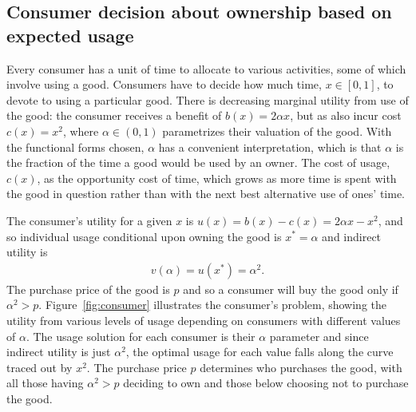 \documentclass[11pt]{article}
\begin{document}
\subsection{Consumer decision about ownership based on expected usage}  
Every consumer has a unit of time to allocate to various activities, some of which involve using a good.  
Consumers have to decide how much time, $x \in [0,1]$, to devote to using a particular good. 
There is decreasing marginal utility from use of the good: 
the consumer receives a benefit of $b(x) = 2\alpha x$, but as also incur cost $c(x) = x^2$,  
where $\alpha \in (0,1)$ parametrizes their valuation of the good.
With the functional forms chosen, $\alpha$ has a convenient interpretation, which is that $\alpha$ is the fraction of the time a good would be used by an owner. 
The cost of usage, $c(x)$, as the opportunity cost of time, which grows as more time is spent with the good in question rather than with the next best alternative use of ones' time.

The consumer's utility for a given $x$ is $u(x) = b(x) - c(x) = 2 \alpha x - x^2$, and so individual usage conditional upon owning the good is $x^* = \alpha$ and indirect utility is 
\begin{align}
v(\alpha) = u(x^*) = \alpha^2.  
\end{align} 
The purchase price of the good is $p$ and so a consumer will buy the good only if $\alpha^2 > p$. 
Figure~\ref{fig:consumer} illustrates the consumer's problem, showing the utility from various levels of usage depending on consumers with different values of $\alpha$.
The usage solution for each consumer is their $\alpha$ parameter and since indirect utility is just $\alpha^2$, the optimal usage for each value falls along the curve traced out by $x^2$.
The purchase price $p$ determines who purchases the good, with all those having $\alpha^2 > p$ deciding to own and those below choosing not to purchase the good. 


\pgfmathsetmacro{\xstarOne}{\alphaOne}%
%

\pgfmathsetmacro{\xstarTwo}{\alphaTwo}%
%

\pgfmathsetmacro{\xstarThree}{\alphaThree}%
%
\end{document}

